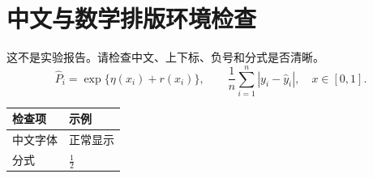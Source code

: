 \documentclass[UTF8,fontset=fandol]{ctexart}
\begin{document}
\section*{中文与数学排版环境检查}
这不是实验报告。请检查中文、上下标、负号和分式是否清晰。
\[
\hat P_i=\exp\{\eta(x_i)+r(x_i)\},\qquad
\frac{1}{n}\sum_{i=1}^{n}|y_i-\hat y_i|,\quad x\in[0,1].
\]
\begin{center}
\begin{tabular}{ll}\toprule
检查项 & 示例\\\midrule
中文字体 & 正常显示\\
分式 & $\frac12$\\\bottomrule
\end{tabular}
\end{center}
\end{document}
